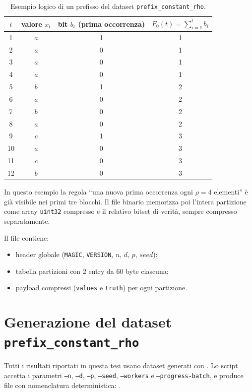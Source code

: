 \begin{table}[htbp]
    \centering
    \small
    \begin{tabular}{|c|c|c|c|}
        \hline
        \(t\) & valore \(x_t\) & bit \(b_t\) (prima occorrenza) & \(F_0(t)=\sum_{i=1}^{t} b_i\) \\
        \hline
        1 & \(a\) & 1 & 1 \\
        2 & \(a\) & 0 & 1 \\
        3 & \(a\) & 0 & 1 \\
        4 & \(a\) & 0 & 1 \\
        5 & \(b\) & 1 & 2 \\
        6 & \(a\) & 0 & 2 \\
        7 & \(b\) & 0 & 2 \\
        8 & \(a\) & 0 & 2 \\
        9 & \(c\) & 1 & 3 \\
        10 & \(a\) & 0 & 3 \\
        11 & \(c\) & 0 & 3 \\
        12 & \(b\) & 0 & 3 \\
        \hline
    \end{tabular}
    \caption{Esempio logico di un prefisso del dataset \texttt{prefix\_constant\_rho}.}
    \label{tab:dataset-example-logical}
\end{table}

In questo esempio la regola ``una nuova prima occorrenza ogni \(\rho=4\) elementi''
è già visibile nei primi tre blocchi. Il file binario memorizza poi l'intera
partizione come array \texttt{uint32} compresso e il relativo bitset di verità,
sempre compresso separatamente.

Il file contiene:
\begin{itemize}
    \item header globale (\texttt{MAGIC}, \texttt{VERSION}, \(n\), \(d\), \(p\), \(seed\));
    \item tabella partizioni con 2 entry da 60 byte ciascuna;
    \item payload compressi (\texttt{values} e \texttt{truth}) per ogni partizione.
\end{itemize}

\section{Generazione del dataset \texttt{prefix\_constant\_rho}}
\label{sec:prefix-constant-rho}

Tutti i risultati riportati in questa tesi usano dataset generati con
. Lo script accetta
i parametri \texttt{--n}, \texttt{--d}, \texttt{--p}, \texttt{--seed},
\texttt{--workers} e \texttt{--progress-batch}, e produce file con nomenclatura
deterministica:
.

